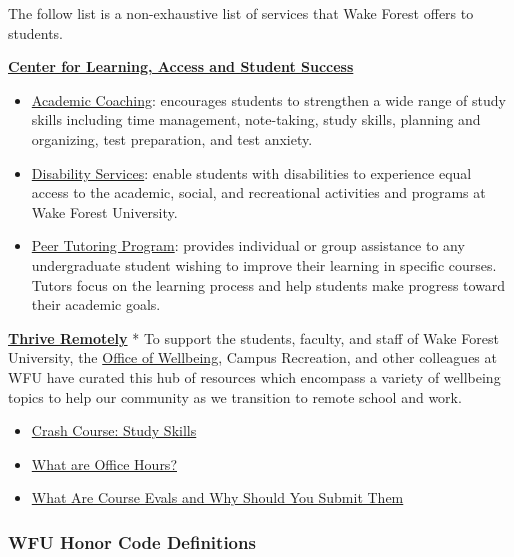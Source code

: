 \documentclass[
]{book}
\begin{document}
The follow list is a non-exhaustive list of services that Wake Forest offers to students.

\textbf{\href{https://class.wfu.edu/}{Center for Learning, Access and Student Success}}

\begin{itemize}
\item
  \href{https://class.wfu.edu/}{Academic Coaching}: encourages students to strengthen a wide range of study skills including time management, note-taking, study skills, planning and organizing, test preparation, and test anxiety.
\item
  \href{https://class.wfu.edu/}{Disability Services}: enable students with disabilities to experience equal access to the academic, social, and recreational activities and programs at Wake Forest University.
\item
  \href{https://class.wfu.edu/}{Peer Tutoring Program}: provides individual or group assistance to any undergraduate student wishing to improve their learning in specific courses. Tutors focus on the learning process and help students make progress toward their academic goals.
\end{itemize}

\textbf{\href{https://thrive.wfu.edu/thrive-remotely-2/}{Thrive Remotely}}
* To support the students, faculty, and staff of Wake Forest University, the \href{https://thrive.wfu.edu/}{Office of Wellbeing}, Campus Recreation, and other colleagues at WFU have curated this hub of resources which encompass a variety of wellbeing topics to help our community as we transition to remote school and work.

\begin{itemize}
\item
  \href{https://www.youtube.com/watch?v=E7CwqNHn_Ns&list=PL8dPuuaLjXtNcAJRf3bE1IJU6nMfHj86W}{Crash Course: Study Skills}
\item
  \href{https://vimeo.com/270014784?embedded=true&source=vimeo_logo&owner=2248721}{What are Office Hours?}
\item
  \href{https://www.youtube.com/watch?v=5zkAOpx8Qk8}{What Are Course Evals and Why Should You Submit Them}
\end{itemize}

\subsubsection{WFU Honor Code Definitions}\label{wfu-honor-code-definitions}
\end{document}
